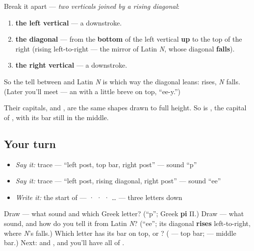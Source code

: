 Break it apart — \emph{two verticals joined by a rising diagonal}:

\begin{enumerate}
\raggedright
  \item \textbf{the left vertical} — a downstroke.
  \item \textbf{the diagonal} — from the \textbf{bottom} of the left vertical \textbf{up} to the top of the right (rising left-to-right — the mirror of Latin \emph{N}, whose diagonal \textbf{falls}).
  \item \textbf{the right vertical} — a downstroke.
\end{enumerate}

So the tell between \emph{} and Latin \emph{N} is which way the diagonal leans: \textbf{} rises, \emph{N} falls. (Later you'll meet \textbf{} — an \emph{} with a little breve on top, \textquotedblleft{}ee-y.\textquotedblright{})

Their capitals, \textbf{} and \textbf{}, are the same shapes drawn to full height. So is \textbf{}, the capital of \textbf{}, with its bar still in the middle.

\subsection*{Your turn}
\begin{itemize}
\raggedright
  \item \emph{Say it:} trace  — \textquotedblleft{}left post, top bar, right post\textquotedblright{} — sound \textquotedblleft{}p\textquotedblright{}
  \item \emph{Say it:} trace  — \textquotedblleft{}left post, rising diagonal, right post\textquotedblright{} — sound \textquotedblleft{}ee\textquotedblright{}
  \item \emph{Write it:} the start of \emph{} —  ·  ·  · … — three letters down
\end{itemize}

\begin{tcolorbox}[breakable,colback=teal!4,colframe=teal!35!black,title={Before you move on}]
Draw \textbf{} — what sound and which Greek letter? (\textquotedblleft{}p\textquotedblright{}; Greek \textbf{pi} Π.) Draw \textbf{} — what sound, and how do you tell it from Latin \emph{N}? (\textquotedblleft{}ee\textquotedblright{}; its diagonal \textbf{rises} left-to-right, where \emph{N}'s falls.) Which letter has its bar on top,  or ? ( — top bar;  — middle bar.) Next: \textbf{} and \textbf{}, and you'll have all of \emph{}.
\end{tcolorbox}
